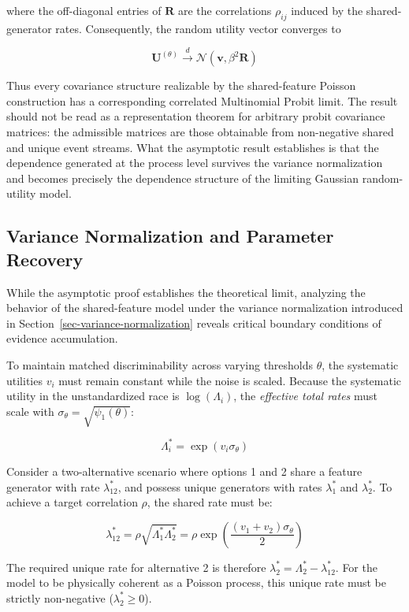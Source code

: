 \documentclass[
  man,
  floatsintext,
  longtable,
  a4paper,
  nolmodern,
  notxfonts,
  notimes,
  colorlinks=true,linkcolor=blue,citecolor=blue,urlcolor=blue]{apa7}
\begin{document}
where the off-diagonal entries of \(\mathbf{R}\) are the correlations
\(\rho_{ij}\) induced by the shared-generator rates. Consequently, the
random utility vector converges to

\[\mathbf{U}^{(\theta)} \xrightarrow{d} \mathcal{N}(\mathbf{v}, \beta^2 \mathbf{R})\]

Thus every covariance structure realizable by the shared-feature Poisson
construction has a corresponding correlated Multinomial Probit limit.
The result should not be read as a representation theorem for arbitrary
probit covariance matrices: the admissible matrices are those obtainable
from non-negative shared and unique event streams. What the asymptotic
result establishes is that the dependence generated at the process level
survives the variance normalization and becomes precisely the dependence
structure of the limiting Gaussian random-utility model.

\subsection{Variance Normalization and Parameter
Recovery}\label{variance-normalization-and-parameter-recovery}

While the asymptotic proof establishes the theoretical limit, analyzing
the behavior of the shared-feature model under the variance
normalization introduced in Section~\ref{sec-variance-normalization}
reveals critical boundary conditions of evidence accumulation.

To maintain matched discriminability across varying thresholds
\(\theta\), the systematic utilities \(v_i\) must remain constant while
the noise is scaled. Because the systematic utility in the
unstandardized race is \(\log(\Lambda_i)\), the \emph{effective total
rates} must scale with \(\sigma_\theta = \sqrt{\psi_1(\theta)}\):

\[\Lambda_i^* = \exp(v_i \sigma_\theta)\]

Consider a two-alternative scenario where options 1 and 2 share a
feature generator with rate \(\lambda_{12}^*\), and possess unique
generators with rates \(\lambda_1^*\) and \(\lambda_2^*\). To achieve a
target correlation \(\rho\), the shared rate must be:

\[\lambda_{12}^* = \rho \sqrt{\Lambda_1^* \Lambda_2^*} = \rho \exp\left(\frac{(v_1 + v_2) \sigma_\theta}{2}\right)\]

The required unique rate for alternative 2 is therefore
\(\lambda_2^* = \Lambda_2^* - \lambda_{12}^*\). For the model to be
physically coherent as a Poisson process, this unique rate must be
strictly non-negative (\(\lambda_2^* \ge 0\)).
\end{document}
